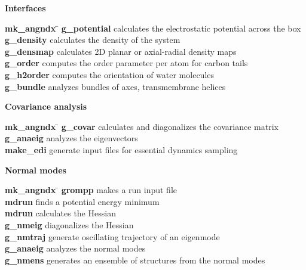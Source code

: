 \begin{description}
\item {\large\bf Interfaces}
\vspace{-2ex}\begin{tabbing}
{\bf mk\_angndx} \= \kill
{\bf g\_potential} \> calculates the electrostatic potential across the box \\
{\bf g\_density} \> calculates the density of the system \\
{\bf g\_densmap} \> calculates 2D planar or axial-radial density maps \\
{\bf g\_order} \> computes the order parameter per atom for carbon tails \\
{\bf g\_h2order} \> computes the orientation of water molecules \\
{\bf g\_bundle} \> analyzes bundles of axes, {\eg} transmembrane helices \\
\end{tabbing}\vspace{-2ex}

\item {\large\bf Covariance analysis}
\vspace{-2ex}\begin{tabbing}
{\bf mk\_angndx} \= \kill
{\bf g\_covar} \> calculates and diagonalizes the covariance matrix \\
{\bf g\_anaeig} \> analyzes the eigenvectors \\
{\bf make\_edi} \> generate input files for essential dynamics sampling \\
\end{tabbing}\vspace{-2ex}

\item {\large\bf Normal modes}
\vspace{-2ex}\begin{tabbing}
{\bf mk\_angndx} \= \kill
{\bf grompp} \> makes a run input file \\
{\bf mdrun} \> finds a potential energy minimum \\
{\bf mdrun} \> calculates the Hessian \\
{\bf g\_nmeig} \> diagonalizes the Hessian  \\
{\bf g\_nmtraj} \> generate oscillating trajectory of an eigenmode \\
{\bf g\_anaeig} \> analyzes the normal modes \\
{\bf g\_nmens} \> generates an ensemble of structures from the normal modes \\
\end{tabbing}\vspace{-2ex}

\end{description}

